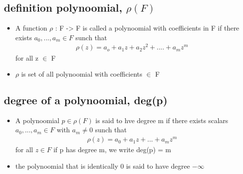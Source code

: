 \documentclass[a4paper,12pt]{article}
\begin{document}
    \subsection{definition \textbf{polynoomial,} $\rho(F)$}
    \begin{itemize}
        \item A function $\rho$ : F -> F is called a polynoomial with coefficients in F if 
        there exists $a_0,...,a_m \in F$ sunch that
        \begin{align*}
            \rho(z) = a_o + a_1z + a_2z^2 + .... +a_mz^m
        \end{align*} 
        for all z $\in$ F
        \item $\rho$ is set of all polynoomial with coefficients $\in$ F
    \end{itemize}
    \subsection{\textbf{degree of a polynoomial,} deg(p)}
    \begin{itemize}
        \item A polynoomial $p \in \rho(F)$ is said to hve degree m if 
        there exists scalars $a_0,...,a_m \in F$ with $a_m \neq 0$ sunch that
        \begin{align*}
            \rho(z) = a_0 + a_1z +...+ a_mz^m
        \end{align*}
        for all $z \in F$ if p has degree m, we write deg(p) = m
        \item the polynoomial that is identically 0 is said to have degree $-\infty$
    \end{itemize}
\end{document}
